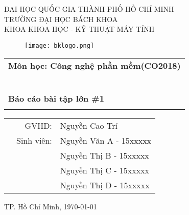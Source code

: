 \documentclass[a4paper]{article}
\newcommand{\monhoc}{Công nghệ phần mềm}
\begin{document}
\begin{titlepage}
\begin{center}
ĐẠI HỌC QUỐC GIA THÀNH PHỐ HỒ CHÍ MINH \\
TRƯỜNG ĐẠI HỌC BÁCH KHOA \\
KHOA KHOA HỌC - KỸ THUẬT MÁY TÍNH 
\end{center}

\vspace{1cm}

\begin{figure}[h!]
\begin{center}
\texttt{[image: bklogo.png]}
\end{center}
\end{figure}

\vspace{1cm}


\begin{center}
\begin{tabular}{c}
\multicolumn{1}{l}{\textbf{{\Large Môn học: \monhoc (CO2018)}}}\\
~~\\
\hline
\\
\multicolumn{1}{l}{\textbf{{\Large Báo cáo bài tập lớn \#1}}}\\
\\
\hline
\end{tabular}
\end{center}

\vspace{3cm}

\begin{table}[h]
\begin{tabular}{rrl}
\vspace*{1em}
\hspace{5 cm} & GVHD: & Nguyễn Cao Trí\\

& Sinh viên: & Nguyễn Văn A - 15xxxxx \\
& & Nguyễn Thị B - 15xxxxx\\
& & Nguyễn Thị C - 15xxxxx\\
& & Nguyễn Thị D - 15xxxxx\\
\end{tabular}
\end{table}
\vspace*{\fill}
\begin{center}
{\footnotesize TP. Hồ Chí Minh, \today}
\end{center}
\end{titlepage}
\newpage
\thispagestyle{empty}
\tableofcontents
\newpage
\thispagestyle{fancy}
\end{document}
